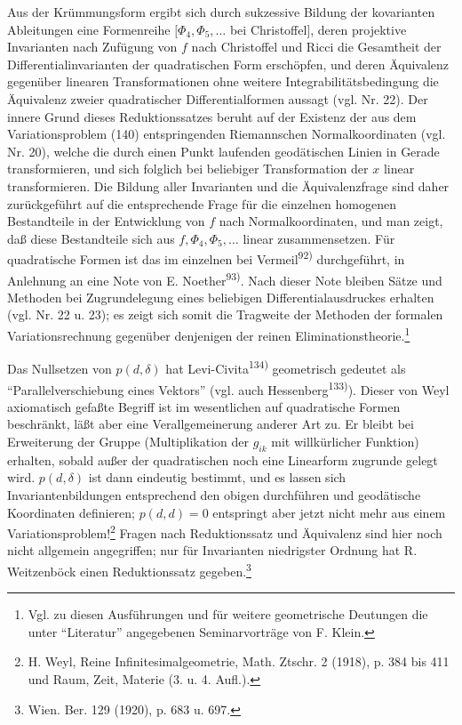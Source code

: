 \documentclass[11pt]{article}
\begin{document}
Aus der Krümmungsform ergibt sich durch sukzessive Bildung der kovarianten Ableitungen eine Formenreihe $[\Phi_4,\Phi_5,\ldots$ bei Christoffel], deren projektive Invarianten nach Zufügung von $f$ nach Christoffel und Ricci die Gesamtheit der Differentialinvarianten der quadratischen Form erschöpfen, und deren Äquivalenz gegenüber linearen Transformationen ohne weitere Integrabilitätsbedingung die Äquivalenz zweier quadratischer Differentialformen aussagt (vgl. Nr. 22). Der innere Grund dieses Reduktionssatzes beruht auf der Existenz der aus dem Variationsproblem (140) entspringenden Riemannschen Normalkoordinaten (vgl. Nr. 20), welche die durch einen Punkt laufenden geodätischen Linien in Gerade transformieren, und sich folglich bei beliebiger Transformation der $x$ linear transformieren. Die Bildung aller Invarianten und die Äquivalenzfrage sind daher zurückgeführt auf die entsprechende Frage für die einzelnen homogenen Bestandteile in der Entwicklung von $f$ nach Normalkoordinaten, und man zeigt, daß diese Bestandteile sich aus $f,\Phi_4,\Phi_5,\ldots$ linear zusammensetzen. Für quadratische Formen ist das im einzelnen bei Vermeil\textsuperscript{92)} durchgeführt, in Anlehnung an eine Note von E. Noether\textsuperscript{93)}. Nach dieser Note bleiben Sätze und Methoden bei Zugrundelegung eines beliebigen Differentialausdruckes erhalten (vgl. Nr. 22 u. 23); es zeigt sich somit die Tragweite der Methoden der formalen Variationsrechnung gegenüber denjenigen der reinen Eliminationstheorie.\footnote{Vgl. zu diesen Ausführungen und für weitere geometrische Deutungen die unter ``Literatur'' angegebenen Seminarvorträge von F. Klein.}

Das Nullsetzen von $p(d,\delta)$ hat Levi-Civita\textsuperscript{134)} geometrisch gedeutet als ``Parallelverschiebung eines Vektors'' (vgl. auch Hessenberg\textsuperscript{133)}). Dieser von Weyl axiomatisch gefaßte Begriff ist im wesentlichen auf quadratische Formen beschränkt, läßt aber eine Verallgemeinerung anderer Art zu. Er bleibt bei Erweiterung der Gruppe (Multiplikation der $g_{ik}$ mit willkürlicher Funktion) erhalten, sobald außer der quadratischen noch eine Linearform zugrunde gelegt wird. $p(d,\delta)$ ist dann eindeutig bestimmt, und es lassen sich Invariantenbildungen entsprechend den obigen durchführen und geodätische Koordinaten definieren; $p(d,d)=0$ entspringt aber jetzt nicht mehr aus einem Variationsproblem!\footnote{H. Weyl, Reine Infinitesimalgeometrie, Math. Ztschr. 2 (1918), p. 384 bis 411 und Raum, Zeit, Materie (3. u. 4. Aufl.).} Fragen nach Reduktionssatz und Äquivalenz sind hier noch nicht allgemein angegriffen; nur für Invarianten niedrigster Ordnung hat R. Weitzenböck einen Reduktionssatz gegeben.\footnote{Wien. Ber. 129 (1920), p. 683 u. 697.}
\end{document}
